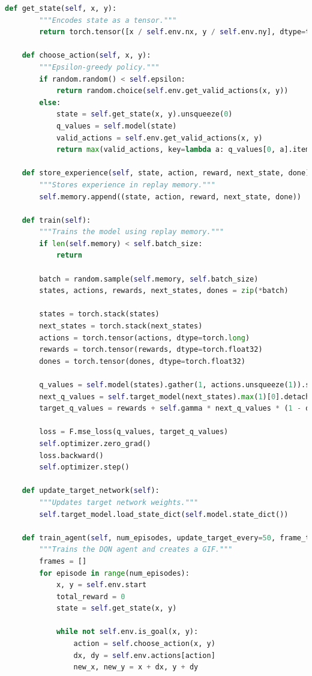 \documentclass[11pt]{article}
\begin{document}
\begin{lstlisting}[language=Python]
    def get_state(self, x, y):
        """Encodes state as a tensor."""
        return torch.tensor([x / self.env.nx, y / self.env.ny], dtype=torch.float32)

    def choose_action(self, x, y):
        """Epsilon-greedy policy."""
        if random.random() < self.epsilon:
            return random.choice(self.env.get_valid_actions(x, y))
        else:
            state = self.get_state(x, y).unsqueeze(0)
            q_values = self.model(state)
            valid_actions = self.env.get_valid_actions(x, y)
            return max(valid_actions, key=lambda a: q_values[0, a].item())

    def store_experience(self, state, action, reward, next_state, done):
        """Stores experience in replay memory."""
        self.memory.append((state, action, reward, next_state, done))

    def train(self):
        """Trains the model using replay memory."""
        if len(self.memory) < self.batch_size:
            return

        batch = random.sample(self.memory, self.batch_size)
        states, actions, rewards, next_states, dones = zip(*batch)

        states = torch.stack(states)
        next_states = torch.stack(next_states)
        actions = torch.tensor(actions, dtype=torch.long)
        rewards = torch.tensor(rewards, dtype=torch.float32)
        dones = torch.tensor(dones, dtype=torch.float32)

        q_values = self.model(states).gather(1, actions.unsqueeze(1)).squeeze(1)
        next_q_values = self.target_model(next_states).max(1)[0].detach()
        target_q_values = rewards + self.gamma * next_q_values * (1 - dones)

        loss = F.mse_loss(q_values, target_q_values)
        self.optimizer.zero_grad()
        loss.backward()
        self.optimizer.step()

    def update_target_network(self):
        """Updates target network weights."""
        self.target_model.load_state_dict(self.model.state_dict())

    def train_agent(self, num_episodes, update_target_every=50, frame_time=5.0, d_episode=50):
        """Trains the DQN agent and creates a GIF."""
        frames = []
        for episode in range(num_episodes):
            x, y = self.env.start
            total_reward = 0
            state = self.get_state(x, y)

            while not self.env.is_goal(x, y):
                action = self.choose_action(x, y)
                dx, dy = self.env.actions[action]
                new_x, new_y = x + dx, y + dy


\end{lstlisting}
\end{document}
